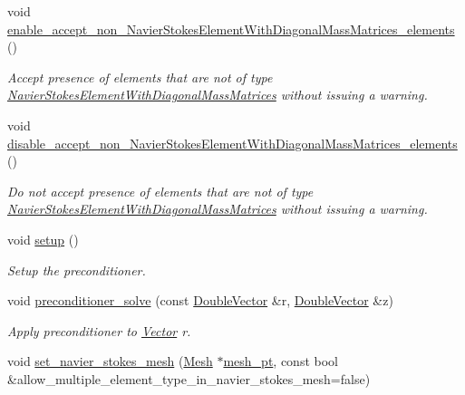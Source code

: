 \begin{DoxyCompactItemize}
void \hyperlink{classoomph_1_1NavierStokesSchurComplementPreconditioner_af406a2d6632c95f7d8b70baba1b912ee}{enable\+\_\+accept\+\_\+non\+\_\+\+Navier\+Stokes\+Element\+With\+Diagonal\+Mass\+Matrices\+\_\+elements} ()
\begin{DoxyCompactList}\small\item\em Accept presence of elements that are not of type \hyperlink{classoomph_1_1NavierStokesElementWithDiagonalMassMatrices}{Navier\+Stokes\+Element\+With\+Diagonal\+Mass\+Matrices} without issuing a warning. \end{DoxyCompactList}\item 
void \hyperlink{classoomph_1_1NavierStokesSchurComplementPreconditioner_a483c96d41a5032f90b8027d6ef2c0c5a}{disable\+\_\+accept\+\_\+non\+\_\+\+Navier\+Stokes\+Element\+With\+Diagonal\+Mass\+Matrices\+\_\+elements} ()
\begin{DoxyCompactList}\small\item\em Do not accept presence of elements that are not of type \hyperlink{classoomph_1_1NavierStokesElementWithDiagonalMassMatrices}{Navier\+Stokes\+Element\+With\+Diagonal\+Mass\+Matrices} without issuing a warning. \end{DoxyCompactList}\item 
void \hyperlink{classoomph_1_1NavierStokesSchurComplementPreconditioner_a03cbfa527081ea03c910aadc281615d7}{setup} ()
\begin{DoxyCompactList}\small\item\em Setup the preconditioner. \end{DoxyCompactList}\item 
void \hyperlink{classoomph_1_1NavierStokesSchurComplementPreconditioner_adbc87003dd8e8c924ae802651b18f2ed}{preconditioner\+\_\+solve} (const \hyperlink{classoomph_1_1DoubleVector}{Double\+Vector} \&r, \hyperlink{classoomph_1_1DoubleVector}{Double\+Vector} \&z)
\begin{DoxyCompactList}\small\item\em Apply preconditioner to \hyperlink{classoomph_1_1Vector}{Vector} r. \end{DoxyCompactList}\item 
void \hyperlink{classoomph_1_1NavierStokesSchurComplementPreconditioner_abe80b5bb32d24f49f427d04118de284a}{set\+\_\+navier\+\_\+stokes\+\_\+mesh} (\hyperlink{classoomph_1_1Mesh}{Mesh} $\ast$\hyperlink{classoomph_1_1BlockPreconditioner_a3c0e92cb77c3e3179007fe9fd99b6428}{mesh\+\_\+pt}, const bool \&allow\+\_\+multiple\+\_\+element\+\_\+type\+\_\+in\+\_\+navier\+\_\+stokes\+\_\+mesh=false)

\end{DoxyCompactItemize}

